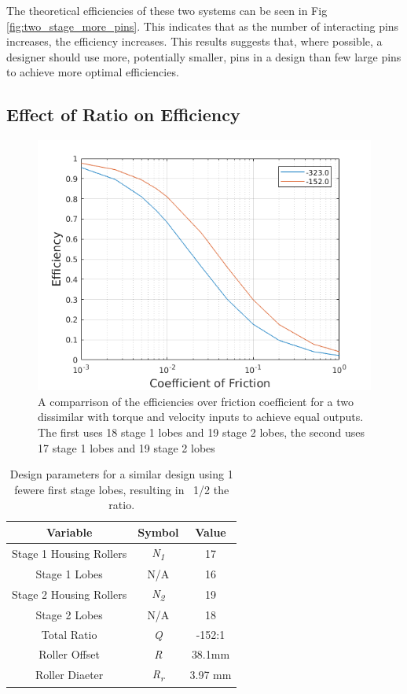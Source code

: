The theoretical efficiencies of these two systems can be seen in Fig \ref{fig:two_stage_more_pins}. This indicates that as the number of interacting pins increases, the efficiency increases. This results suggests that, where possible, a designer should use more, potentially smaller, pins in a design than few large pins to achieve more optimal efficiencies. 


\subsection{Effect of Ratio on Efficiency} \label{ch:dual:discussion:ratio}

\begin{figure}[h]
	\centering
	\includegraphics[width=0.75\linewidth]{fig/two_stage_lower_ratio}
   \caption{A comparrison of the efficiencies over friction coefficient for a two dissimilar with torque and velocity inputs to achieve equal outputs. The first uses 18 stage 1 lobes and 19 stage 2 lobes, the second uses 17 stage 1 lobes and 19 stage 2 lobes}
   \label{fig:two_stage_lower_ratio}
\end{figure}


\begin{table}[h]
  \vskip0.2cm
  \caption{Design parameters for a similar design using 1 fewere first stage lobes, resulting in ~1/2 the ratio.}
  \label{table:two_stage_lower_ratio}
  \begin{center}
    \vskip-0.2cm
	\begin{tabular}{|c|c|c|}
		\hline
		Variable & Symbol & Value\\
		\hline
		Stage 1 Housing Rollers & \textit{N\textsubscript{1}} & 17\\
		\hline
		Stage 1 Lobes & N/A & 16\\
		\hline
		Stage 2 Housing Rollers & \textit{N\textsubscript{2}} & 19\\
		\hline
		Stage 2 Lobes & N/A & 18\\
		\hline
		Total Ratio & \textit{Q} & -152:1 \\
		\hline
		Roller Offset & \textit{R} & 38.1mm \\
		\hline
		Roller Diaeter & \textit{R\textsubscript{r}} & 3.97 mm\\
		\hline
	\end{tabular}
  \end{center}
\end{table}

